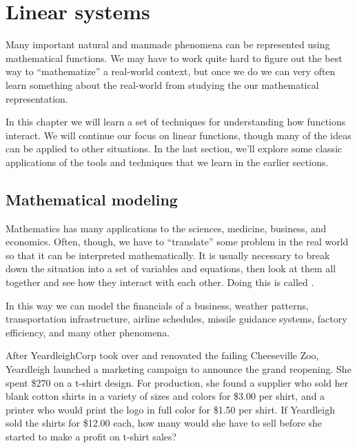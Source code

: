 \chapter{Linear systems}
\label{ch:systems}


Many important natural and manmade phenomena can be represented using mathematical functions. We may have to work quite hard to figure out the best way to ``mathematize'' a real-world context, but once we do we can very often learn something about the real-world from studying the our mathematical representation.

In this chapter we will learn a set of techniques for understanding how functions interact. We will continue our focus on linear functions, though many of the ideas can be applied to other situations. In the last section, we'll explore some classic applications of the tools and techniques that we learn in the earlier sections.

\section{Mathematical modeling}
\label{sec:sysintro}

Mathematics has many applications to the sciences, medicine, business, and economics. Often, though, we have to ``translate'' some problem in the real world so that it can be interpreted mathematically. It is usually necessary to break down the situation into a set of variables and equations, then look at them all together and see how they interact with each other. Doing this is called .

In this way we can model the financials of a business, weather patterns, transportation infrastructure, airline schedules, missile guidance systems, factory efficiency, and many other phenomena.

\begin{boxexplore}
After YeardleighCorp took over and renovated the failing Cheeseville Zoo, Yeardleigh launched a marketing campaign to announce the grand reopening. She spent \$270 on a t-shirt design. For production, she found a supplier who sold her blank cotton shirts in a variety of sizes and colors for \$3.00 per shirt, and a printer who would print the logo in full color for \$1.50 per shirt. If Yeardleigh sold the shirts for \$12.00 each, how many would she have to sell before she started to make a profit on t-shirt sales?
\end{boxexplore}

